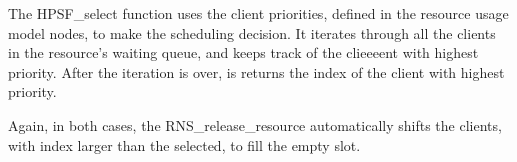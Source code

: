 The HPSF\_select function uses the client priorities, defined in the resource usage model nodes, to make the scheduling decision. It iterates through all the clients in the resource's waiting queue, and keeps track of the clieeeent with highest priority. After the iteration is over, is returns the index of the client with highest priority.

Again, in both cases, the RNS\_release\_resource automatically shifts the clients, with index larger than the selected, to fill the empty slot.





